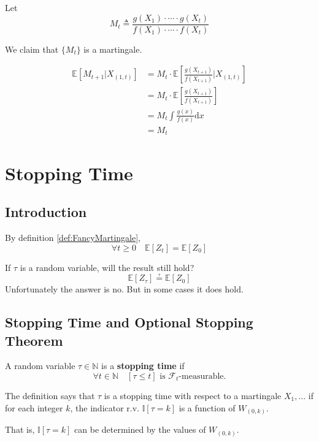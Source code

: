         Let 
        \[ M_t \triangleq \frac{g(X_1)\cdot \cdots \cdot g(X_t)}{f(X_1)\cdot \cdots \cdot f(X_t)} \]

        We claim that $\{M_t\}$ is a martingale.

        \begin{align*}
            \mathbb{E}[M_{t+1}|X_{(1,t)}] &= M_t\cdot\mathbb{E}\left[\frac{g(X_{t+1})}{f(X_{t+1})}|X_{(1,t)}\right]\\
            &= M_t \cdot \mathbb{E}\left[\frac{g(X_{t+1})}{f(X_{t+1})}\right]\\
            &= M_t \int \frac{g(x)}{f(x)}\mathrm{d}x \\
            &= M_t
        \end{align*}


\section{Stopping Time}
    \subsection{Introduction}
        By definition \ref{def:FancyMartingale},
        \[ \forall t \ge 0 \quad \mathbb{E}[Z_t] = \mathbb{E}[Z_0] \]

        If $\tau$ is a random variable, will the result still hold?
        \[\mathbb{E}[Z_{\tau}] \questeq \mathbb{E}[Z_0]\]
        Unfortunately the answer is no. But in some cases it does hold.

    \subsection{Stopping Time and Optional Stopping Theorem}
        \begin{definition}\label{def:StoppingTime}
            A random variable $\tau \in \mathbb{N}$ is a \textbf{stopping time} if
            \[ \forall t \in \mathbb{N} \quad [\tau \le t] \text{ is $\mathcal{F}_t$-measurable.} \]
        \end{definition}
        \begin{remark}
            The definition says that $\tau$ is a stopping time with respect to a martingale $X_1,\dots$ if for each integer $k$, the indicator r.v. $\mathbb{I}[\tau = k]$ is a function of $W_{(0,k)}$.

            That is, $\mathbb{I}[\tau = k]$ can be determined by the values of $W_{(0,k)}$.
        \end{remark}

